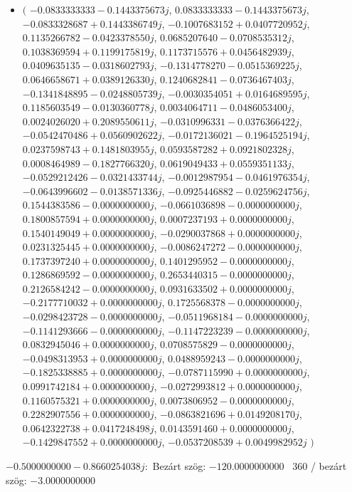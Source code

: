 \documentclass[14pt,a4paper]{article}
\begin{document}
\begin{itemize}
\item
$\big($
$-0.0833333333-0.1443375673j$, $0.0833333333-0.1443375673j$, $-0.0833328687+0.1443386749j$, $-0.1007683152+0.0407720952j$, $0.1135266782-0.0423378550j$, $0.0685207640-0.0708535312j$, $0.1038369594+0.1199175819j$, $0.1173715576+0.0456482939j$, $0.0409635135-0.0318602793j$, $-0.1314778270-0.0515369225j$, $0.0646658671+0.0389126330j$, $0.1240682841-0.0736467403j$, $-0.1341848895-0.0248805739j$, $-0.0030354051+0.0164689595j$, $0.1185603549-0.0130360778j$, $0.0034064711-0.0486053400j$, $0.0024026020+0.2089550611j$, $-0.0310996331-0.0376366422j$, $-0.0542470486+0.0560902622j$, $-0.0172136021-0.1964525194j$, $0.0237598743+0.1481803955j$, $0.0593587282+0.0921802328j$, $0.0008464989-0.1827766320j$, $0.0619049433+0.0559351133j$, $-0.0529212426-0.0321433744j$, $-0.0012987954-0.0461976354j$, $-0.0643996602-0.0138571336j$, $-0.0925446882-0.0259624756j$, $0.1544383586-0.0000000000j$, $-0.0661036898-0.0000000000j$, $0.1800857594+0.0000000000j$, $0.0007237193+0.0000000000j$, $0.1540149049+0.0000000000j$, $-0.0290037868+0.0000000000j$, $0.0231325445+0.0000000000j$, $-0.0086247272-0.0000000000j$, $0.1737397240+0.0000000000j$, $0.1401295952-0.0000000000j$, $0.1286869592-0.0000000000j$, $0.2653440315-0.0000000000j$, $0.2126584242-0.0000000000j$, $0.0931633502+0.0000000000j$, $-0.2177710032+0.0000000000j$, $0.1725568378-0.0000000000j$, $-0.0298423728-0.0000000000j$, $-0.0511968184-0.0000000000j$, $-0.1141293666-0.0000000000j$, $-0.1147223239-0.0000000000j$, $0.0832945046+0.0000000000j$, $0.0708575829-0.0000000000j$, $-0.0498313953+0.0000000000j$, $0.0488959243-0.0000000000j$, $-0.1825338885+0.0000000000j$, $-0.0787115990+0.0000000000j$, $0.0991742184+0.0000000000j$, $-0.0272993812+0.0000000000j$, $0.1160575321+0.0000000000j$, $0.0073806952-0.0000000000j$, $0.2282907556+0.0000000000j$, $-0.0863821696+0.0149208170j$, $0.0642322738+0.0417248498j$, $0.0143591460+0.0000000000j$, $-0.1429847552+0.0000000000j$, $-0.0537208539+0.0049982952j$
$\big)$
\end{itemize}
$-0.5000000000-0.8660254038j$:\
Bezárt szög: $-120.0000000000$ \
360 / bezárt szög: $-3.0000000000$\
\end{document}

